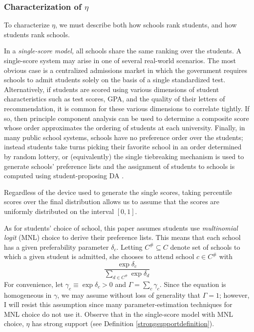 \documentclass[12pt]{article}
\theoremstyle{definition}
\begin{document}
\subsubsection{Characterization of $\eta$}

To characterize $\eta$, we must describe both how schools rank students, and how students rank schools.

In a \emph{single-score model,} all schools share the same ranking over the students. A single-score system may arise in one of several real-world scenarios. The most obvious case is a centralized admissions market in which the government requires schools to admit students solely on the basis of a single standardized test. Alternatively, if students are scored using various dimensions of student characteristics such as test scores, GPA, and the quality of their letters of recommendation, it is common for these various dimensions to correlate tightly. If so, then principle component analysis can be used to determine a composite score whose order approximates the ordering of students at each university. Finally, in many public school systems, schools have no preference order over the students; instead students take turns picking their favorite school in an order determined by random lottery, or (equivalently) the single tiebreaking mechanism is used to generate schools’ preference lists and the assignment of students to schools is computed using student-proposing DA \parencite[][]{whatmatters}. 

Regardless of the device used to generate the single scores, taking percentile scores over the final distribution allows us to assume that the scores are uniformly distributed on the interval $[0,1]$. 

As for students' choice of school, this paper assumes students use \emph{multinomial logit} (MNL) choice to derive their preference lists. This means that each school has a given preferability parameter $\delta_c$. Letting $C^\# \subseteq C$ denote set of schools to which a given student is admitted, she chooses to attend school $c \in C^\#$ with
\[\frac{\exp \delta_c}{\sum_{d \in C^\#} \exp \delta_d}\]
For convenience, let $\gamma_c \equiv \exp \delta_c > 0$ and $\Gamma = \sum_c \gamma_c$. Since the equation is homogeneous in $\gamma$, we may assume without loss of generality that $\Gamma = 1$; however, I will resist this assumption since many parameter-estimation techniques for MNL choice do not use it. 
Observe that in the single-score model with MNL choice, $\eta$ has strong support (see Definition \ref{strongsupportdefinition}). 
\end{document}
